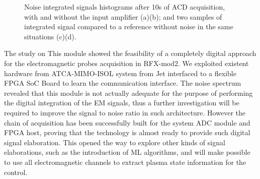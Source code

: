 \begin{figure}
    \centering
    \caption{Noise integrated signals histograms after 10s of ACD acquisition, with and without the input amplifier (a)(b); and two samples of integrated signal compared to a reference without noise in the same situations (c)(d).}
    \label{fig:before_after_correction}
\end{figure}

The study on This module showed the feasibility of a completely digital approach for the electromagnetic probes acquisition in RFX-mod2. We exploited existent hardware from ATCA-MIMO-ISOL system from Jet interfaced to a flexible FPGA SoC Board to learn the communication interface. The noise spectrum revealed that this module is not actually adequate for the purpose of performing the digital integration of the EM signals, thus a further investigation will be required to improve the signal to noise ratio in such architecture. However the chain of acquisition has been successfully built for the system ADC module and FPGA host, proving that the technology is almost ready to provide such digital signal elaboration.
This opened the way to explore other kinds of signal elaborations, such as the introduction of ML algorithms, and will make possible to use all electromagnetic channels to extract plasma state information for the control.

